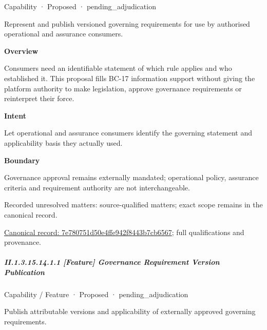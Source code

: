 \label{element:7e780751d50e4ffe942f8443b7cb6567}
{\small Capability · Proposed · pending\_adjudication}\par

Represent and publish versioned governing requirements for use by authorised operational and assurance consumers.



\textbf{Overview}



Consumers need an identifiable statement of which rule applies and who established it. This proposal fills BC-17 information support without giving the platform authority to make legislation, approve governance requirements or reinterpret their force.



\textbf{Intent}



Let operational and assurance consumers identify the governing statement and applicability basis they actually used.



\textbf{Boundary}



Governance approval remains externally mandated; operational policy, assurance criteria and requirement authority are not interchangeable.


{\small Recorded unresolved matters: source-qualified matters; exact scope remains in the canonical record.}\par
{\footnotesize \href{../../../../continuum/strategy/capability/7e780751d50e4ffe942f8443b7cb6567.md}{Canonical record: 7e780751d50e4ffe942f8443b7cb6567}; full qualifications and provenance.}\par
\subparagraph*{II.1.3.15.14.1.1 [Feature] Governance Requirement Version Publication}
\label{navigation:II.1.3.15.14.1.1}

\label{element:001a067a4b3b46bebfe945f1bef541ce}
{\small Capability / Feature · Proposed · pending\_adjudication}\par

Publish attributable versions and applicability of externally approved governing requirements.




